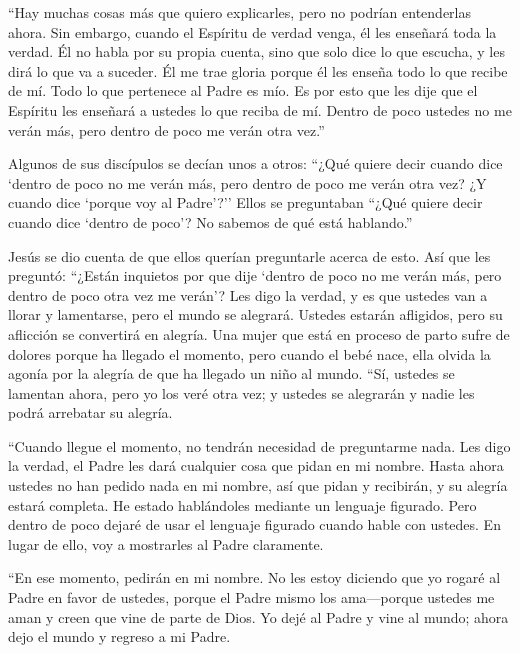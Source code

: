  ``Hay muchas cosas más que quiero explicarles, pero no
podrían entenderlas ahora.  Sin embargo, cuando el Espíritu
de verdad venga, él les enseñará toda la verdad. Él no habla por su
propia cuenta, sino que solo dice lo que escucha, y les dirá lo que va a
suceder.  Él me trae gloria porque él les enseña todo lo
que recibe de mí.  Todo lo que pertenece al Padre es mío.
Es por esto que les dije que el Espíritu les enseñará a ustedes lo que
reciba de mí.  Dentro de poco ustedes no me verán más, pero
dentro de poco me verán otra vez.''

 Algunos de sus discípulos se decían unos a otros: ``¿Qué
quiere decir cuando dice `dentro de poco no me verán más, pero dentro de
poco me verán otra vez? ¿Y cuando dice `porque voy al Padre'?''
 Ellos se preguntaban ``¿Qué quiere decir cuando dice
`dentro de poco'? No sabemos de qué está hablando.''

 Jesús se dio cuenta de que ellos querían preguntarle
acerca de esto. Así que les preguntó: ``¿Están inquietos por que dije
`dentro de poco no me verán más, pero dentro de poco otra vez me verán'?
 Les digo la verdad, y es que ustedes van a llorar y
lamentarse, pero el mundo se alegrará. Ustedes estarán afligidos, pero
su aflicción se convertirá en alegría.  Una mujer que está
en proceso de parto sufre de dolores porque ha llegado el momento, pero
cuando el bebé nace, ella olvida la agonía por la alegría de que ha
llegado un niño al mundo.  ``Sí, ustedes se lamentan ahora,
pero yo los veré otra vez; y ustedes se alegrarán y nadie les podrá
arrebatar su alegría.

 ``Cuando llegue el momento, no tendrán necesidad de
preguntarme nada. Les digo la verdad, el Padre les dará cualquier cosa
que pidan en mi nombre.  Hasta ahora ustedes no han pedido
nada en mi nombre, así que pidan y recibirán, y su alegría estará
completa.  He estado hablándoles mediante un lenguaje
figurado. Pero dentro de poco dejaré de usar el lenguaje figurado cuando
hable con ustedes. En lugar de ello, voy a mostrarles al Padre
claramente.

 ``En ese momento, pedirán en mi nombre. No les estoy
diciendo que yo rogaré al Padre en favor de ustedes, 
porque el Padre mismo los ama---porque ustedes me aman y creen que vine
de parte de Dios.  Yo dejé al Padre y vine al mundo; ahora
dejo el mundo y regreso a mi Padre.

